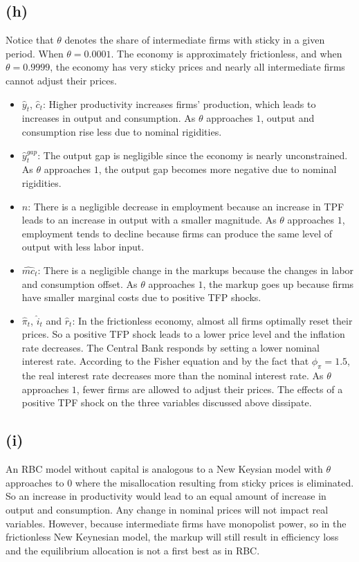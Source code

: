 \documentclass[12pt]{article}
\begin{document}
\subsection*{(h)}

Notice that $\theta$ denotes the share of intermediate firms with sticky in a given period. 
When $\theta=0.0001$. The economy is approximately frictionless, 
and when $\theta=0.9999$, the economy has very sticky prices and nearly all intermediate firms cannot adjust their prices. 

\begin{itemize}
    \item $\hat{y}_{t}$, $\hat{c}_{t}$: Higher productivity increases firms' production, which leads to increases in output and consumption.
    As $\theta$ approaches $1$, output and consumption rise less due to nominal rigidities.
    \item $\hat{y}^{gap}_{t}$: The output gap is negligible since the economy is nearly unconstrained.
    As $\theta$ approaches $1$, the output gap becomes more negative due to nominal rigidities.
    \item $\hat{n}$: There is a negligible decrease in employment because an increase in TPF leads to an increase in output with a smaller magnitude.
    As $\theta$ approaches $1$, employment tends to decline because firms can produce the same level of output with less labor input.
    \item $\hat{mc}_{t}$: There is a negligible change in the markups because the changes in labor and consumption offset.
    As $\theta$ approaches $1$, the markup goes up because firms have smaller marginal costs due to positive TFP shocks. 
    \item $\hat{\pi}_{t}$, $\hat{i}_{t}$ and $\hat{r}_{t}$: In the frictionless economy, almost all firms optimally reset their prices. So a positive TFP shock leads to a lower price level and the inflation rate decreases. The Central Bank responds by setting a lower nominal interest rate. According to the Fisher equation and by the fact that $\phi_{\pi}=1.5$, the real interest rate decreases more than the nominal interest rate.
    As $\theta$ approaches $1$, fewer firms are allowed to adjust their prices. The effects of a positive TPF shock on the three variables discussed above dissipate. 
\end{itemize}

\subsection*{(i)}

An RBC model without capital is analogous to a New Keysian model with $\theta$ approaches to $0$ where the misallocation resulting from sticky prices is eliminated. So an increase in productivity would lead to an equal amount of increase in output and consumption. Any change in nominal prices will not impact real variables. 
However, because intermediate firms have monopolist power, so in the frictionless New Keynesian model, the markup will still result in efficiency loss and the equilibrium allocation is not a first best as in RBC.  
\end{document}
